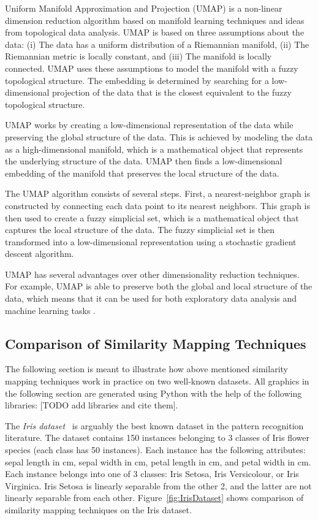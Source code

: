 Uniform Manifold Approximation and Projection (UMAP) is a non-linear
dimension reduction algorithm based on manifold learning techniques and
ideas from topological data analysis. UMAP is based on three assumptions
about the data: (i) The data has a uniform distribution of a Riemannian
manifold, (ii) The Riemannian metric is locally constant, and (iii) The
manifold is locally connected. UMAP uses these assumptions to model the
manifold with a fuzzy topological structure. The embedding is determined
by searching for a low-dimensional projection of the data that is the
closest equivalent to the fuzzy topological structure.

UMAP works by creating a low-dimensional representation of the data while
preserving the global structure of the data. This is achieved by modeling
the data as a high-dimensional manifold, which is a mathematical object
that represents the underlying structure of the data. UMAP then finds a
low-dimensional embedding of the manifold that preserves the local
structure of the data.

The UMAP algorithm consists of several steps. First, a nearest-neighbor
graph is constructed by connecting each data point to its nearest
neighbors. This graph is then used to create a fuzzy simplicial set, which
is a mathematical object that captures the local structure of the data.
The fuzzy simplicial set is then transformed into a low-dimensional
representation using a stochastic gradient descent algorithm.

UMAP has several advantages over other dimensionality reduction
techniques. For example, UMAP is able to preserve both the global and
local structure of the data, which means that it can be used for both
exploratory data analysis and machine learning tasks
\parencite{mcinnes2018umap}.


\subsection{Comparison of Similarity Mapping Techniques}

The following section is meant to illustrate how above mentioned
similarity mapping techniques work in practice on two well-known datasets.
All graphics in the following section are generated using Python with the
help of the following libraries: [TODO add libraries and cite them].

The \emph{Iris dataset}~\parencite{fisher1936use} is arguably the best known
dataset in the pattern recognition literature. The dataset contains 150
instances belonging to 3 classes of Iris flower species (each class has 50
instances). Each instance has the following attributes: sepal length in
cm, sepal width in cm, petal length in cm, and petal width in cm. Each
instance belongs into one of 3 classes: Iris Setosa, Iris Versicolour, or
Iris Virginica. Iris Setosa is linearly separable from the
other 2, and the latter are not linearly separable from each other.
Figure~\ref{fig:IrisDataset} shows comparison of similarity mapping
techniques on the Iris dataset.

